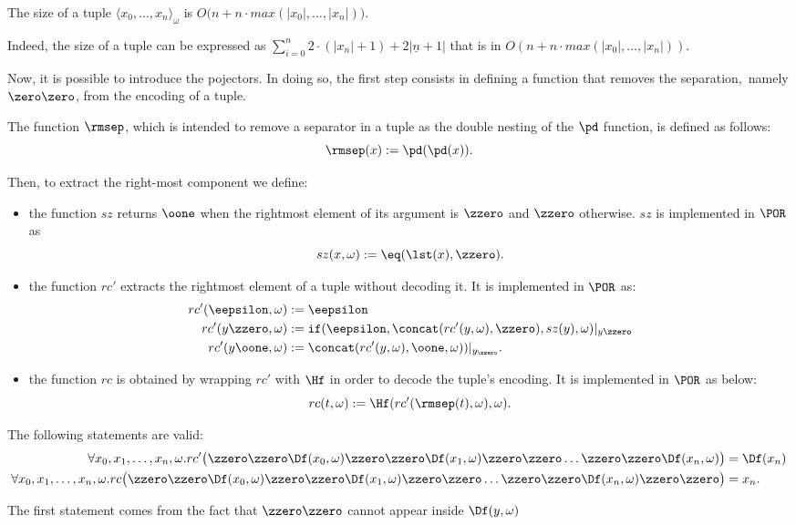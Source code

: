 \begin{prop}\label{prop:size}
The size of a tuple
$\langle x_0,\dots, x_n\rangle_\omega$
is $O\big(n+n \cdot max(|x_0|,\dots, |x_n|)\big)$.
\end{prop}

Indeed,
the size of a tuple can be expressed
as {$\sum^n_{i=0}2\cdot
(|x_n| + 1)+2|\underline n+1|$ that
is in $O(n+n \cdot max(|x_0|,\dots,|x_n|))$}.




Now, it is possible to introduce the
pojectors.
In doing so, the first step
consists
in defining a function
that removes the separation,~namely
$\zero\zero$,
from the encoding of a tuple.


\begin{defn}
The function $\rmsep$,
which is intended to
remove a separator
in a tuple
as the double nesting
of the $\pd$ function,
is defined
as follows:
$$
\rmsep(x) := \pd(\pd(x)).
$$
\end{defn}
%
%
\noindent
Then, to extract
the right-most component
we define:
\begin{itemize}
\item the function
$sz$ returns $\oone$
when the rightmost element
of its argument is $\zzero$ and $\zzero$ otherwise.
$sz$ is implemented in $\POR$ as
$$
sz(x,\omega) := \eq(\lst(x),\zzero).
$$

\item the function $rc'$
extracts the rightmost
element of a tuple without
decoding it.
It is implemented in $\POR$
as:
\begin{align*}
rc'(\eepsilon,\omega) &:= \eepsilon \\
%
rc'(y\zzero, \omega) &:= \mathtt{if}(\eepsilon,
\concat(rc'(y,\omega),\zzero),
sz(y),\omega)|_{y\zzero} \\
%
rc'(y\oone,\omega) &:=
\concat(rc'(y,\omega),
\oone,\omega))|_{y_\zzero}.
\end{align*}

\item the function $rc$
is obtained by wrapping $rc'$
with $\Hf$
in order to decode the tuple's
encoding.
It is implemented in $\POR$ as below:
$$
rc(t,\omega) := \Hf(rc'(\rmsep(t),\omega),\omega).
$$
\end{itemize}




\begin{prop}[Correctness of $rc$]
The following statements are valid:
\begin{align*}
\forall x_0,x_1,\dots, x_n,\omega.rc'\big(
{\zzero\zzero\Df(x_0,\omega)
\zzero\zzero \Df(x_1,\omega)\zzero\zzero\dots
\zzero\zzero\Df(x_n,\omega)}\big) &= \Df(x_n) \\
%
\forall x_0,x_1,\dots, x_n,\omega.
rc\big({\zzero\zzero \Df(x_0,\omega)
\zzero\zzero \Df(x_1,\omega)\zzero\zzero\dots
\zzero\zzero\Df(x_n,\omega)\zzero\zzero}\big)
&= x_n.
\end{align*}
\end{prop}
The first statement comes from the
fact that $\zzero\zzero$ cannot appear
inside $\Df(y,\omega)$


